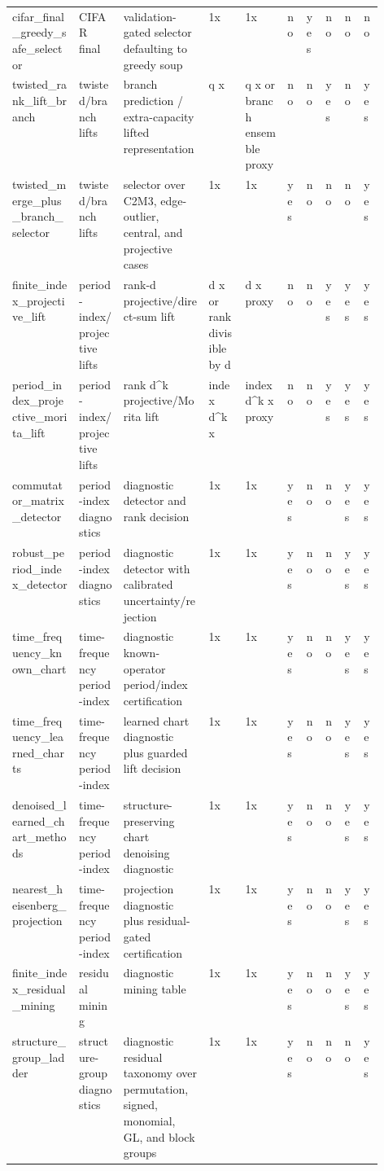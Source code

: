 \begin{longtable}{p{0.18\linewidth}p{0.12\linewidth}p{0.23\linewidth}lllllll}
cifar\_final\_greedy\_safe\_selector & CIFAR final & validation-gated selector defaulting to greedy soup & 1x & 1x & no & yes & no & no & no \\
twisted\_rank\_lift\_branch & twisted/branch lifts & branch prediction / extra-capacity lifted representation & q x & q x or branch ensemble proxy & no & no & yes & no & yes \\
twisted\_merge\_plus\_branch\_selector & twisted/branch lifts & selector over C2M3, edge-outlier, central, and projective cases & 1x & 1x & yes & no & no & no & yes \\
finite\_index\_projective\_lift & period-index/projective lifts & rank-d projective/direct-sum lift & d x or rank divisible by d & d x proxy & no & no & yes & yes & yes \\
period\_index\_projective\_morita\_lift & period-index/projective lifts & rank d\textasciicircum{}k projective/Morita lift & index d\textasciicircum{}k x & index d\textasciicircum{}k x proxy & no & no & yes & yes & yes \\
commutator\_matrix\_detector & period-index diagnostics & diagnostic detector and rank decision & 1x & 1x & yes & no & no & yes & yes \\
robust\_period\_index\_detector & period-index diagnostics & diagnostic detector with calibrated uncertainty/rejection & 1x & 1x & yes & no & no & yes & yes \\
time\_frequency\_known\_chart & time-frequency period-index & diagnostic known-operator period/index certification & 1x & 1x & yes & no & no & yes & yes \\
time\_frequency\_learned\_charts & time-frequency period-index & learned chart diagnostic plus guarded lift decision & 1x & 1x & yes & no & no & yes & yes \\
denoised\_learned\_chart\_methods & time-frequency period-index & structure-preserving chart denoising diagnostic & 1x & 1x & yes & no & no & yes & yes \\
nearest\_heisenberg\_projection & time-frequency period-index & projection diagnostic plus residual-gated certification & 1x & 1x & yes & no & no & yes & yes \\
finite\_index\_residual\_mining & residual mining & diagnostic mining table & 1x & 1x & yes & no & no & yes & yes \\
structure\_group\_ladder & structure-group diagnostics & diagnostic residual taxonomy over permutation, signed, monomial, GL, and block groups & 1x & 1x & yes & no & no & no & yes \\

\end{longtable}
